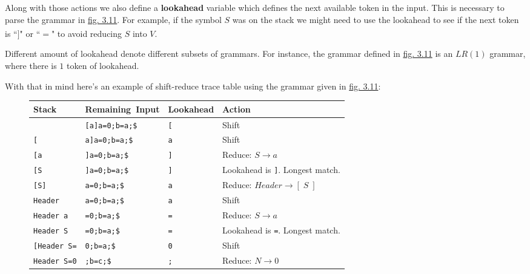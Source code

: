 Along with those actions we also define a \textbf{lookahead} variable which defines the next available token in the input. This is necessary to parse the grammar in \hyperref[fig:3.11]{fig. 3.11}. For example, if the symbol $S$ was on the stack we might need to use the lookahead to see if the next token is ``$]$" or ``$=$" to avoid reducing $S$ into $V$.\textsuperscript{\cite{johnson_zelenski_2007}\cite{knuth_1965}}

Different amount of lookahead denote different subsets of grammars. For instance, the grammar defined in \hyperref[fig:3.11]{fig. 3.11} is an $LR(1)$ grammar, where there is $1$ token of lookahead.

With that in mind here's an example of shift-reduce trace table using the grammar given in \hyperref[fig:3.11]{fig. 3.11}:

\begin{figure}[H]
    \begin{center}
        \begin{tabular}{| m{3.5cm} | m{3cm} | m{2cm} | m{5cm} |}
            \hline
            Stack & \mbox{Remaining Input} & Lookahead & Action\\
            \hline
            & \verb|[a]a=0;b=a;$| & \verb|[| & Shift\\
            \hline
            \verb|[| & \verb|a]a=0;b=a;$| & \verb|a| & Shift\\
            \hline
            \verb|[a| & \verb|]a=0;b=a;$| & \verb|]| & Reduce: $S \rightarrow a$\\
            \hline
            \verb|[S| & \verb|]a=0;b=a;$| & \verb|]| & Lookahead is \verb|]|. Longest match.\\
            \hline
            \verb|[S]| & \verb|a=0;b=a;$| & \verb|a| & Reduce: $Header \rightarrow [\;S\;]$\\
            \hline
            \verb|Header| & \verb|a=0;b=a;$| & \verb|a| & Shift\\
            \hline
            \verb|Header a| & \verb|=0;b=a;$| & \verb|=| & Reduce: $S \rightarrow a$\\
            \hline
            \verb|Header S| & \verb|=0;b=a;$| & \verb|=| & Lookahead is \verb|=|. Longest match.\\
            \hline
            \verb|[Header S=| & \verb|0;b=a;$| & \verb|0| & Shift\\
            \hline
            \verb|Header S=0| & \verb|;b=c;$| & \verb|;| & Reduce: $N \rightarrow 0$\\
            \hline

\end{tabular}
\end{center}
\end{figure}
